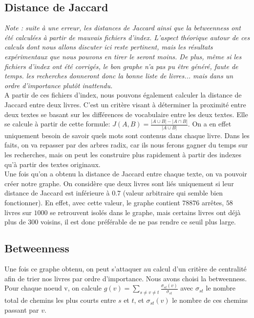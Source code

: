 \documentclass{article}
\begin{document}
\subsection{Distance de Jaccard}

\textit{Note : suite à une erreur, les distances de Jaccard ainsi que la betweenness ont été calculées à partir de mauvais fichiers d'index. L'aspect théorique autour de ces calculs dont nous allons discuter ici reste pertinent, mais les résultats expérimentaux que nous pouvons en tirer le seront moins. De plus, même si les fichiers d'index ont été corrigés, le bon graphe n'a pas pu être généré, faute de temps. les recherches donneront donc la bonne liste de livres... mais dans un ordre d'importance plutôt inattendu.}\\

A partir de ces fichiers d'index, nous pouvons également calculer la distance de Jaccard entre deux livres. C'est un critère visant à déterminer la proximité entre deux textes se basant sur les différences de vocabulaire entre les deux textes. Elle se calcule à partir de cette formule:
$J(A,B) = \frac{|A \cup B| - |A \cap B|}{|A \cup B|}$. On a en effet uniquement besoin de savoir quels mots sont contenus dans chaque livre. Dans les faits, on va repasser par des arbres radix, car ils nous ferons gagner du temps sur les recherches, mais on peut les construire plus rapidement à partir des indexes qu'à partir des textes originaux.\\

Une fois qu'on a obtenu la distance de Jaccard entre chaque texte, on va pouvoir créer notre graphe. On considère que deux livres sont liés uniquement si leur distance de Jaccard est inférieure à $0.7$ (valeur arbitraire qui semble bien fonctionner). En effet, avec cette valeur, le graphe contient $78876$ arrêtes, $58$ livres sur $1000$ se retrouvent isolés dans le graphe, mais certains livres ont déjà plus de $300$ voisins, il est donc préférable de ne pas rendre ce seuil plus large.

\subsection{Betweenness}

Une fois ce graphe obtenu, on peut s'attaquer au calcul d'un critère de centralité afin de trier nos livres par ordre d'importance. Nous avons choisi la betweenness.
Pour chaque noeud v, on calcule $g(v)= \sum_{s \neq v \neq t}\frac{\sigma_{st}(v)}{\sigma_{st}}$ avec  $\sigma_{st}$ le nombre total de chemins les plus courts entre $s$ et $t$, et  $\sigma_{st}(v)$ le nombre de ces chemins passant par $v$.\\
\end{document}
